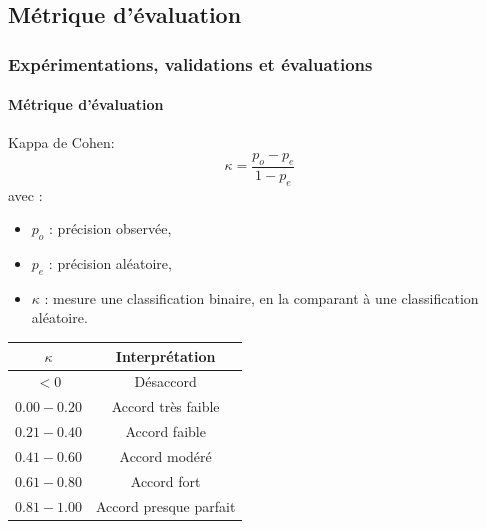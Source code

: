 \documentclass{beamer}
\begin{document}
		\subsection{Métrique d'évaluation}
			\begin{frame}
				\frametitle{Expérimentations, validations et évaluations}
				\framesubtitle{Métrique d'évaluation}
				Kappa de Cohen:
				\begin{equation*}
					\kappa = \frac{p_o - p_e}{1 - p_e}
				\end{equation*}
				avec :
				\begin{itemize}
					\item $p_o$ : précision observée,
					\item $p_e$ : précision aléatoire,
					\item $\kappa$ : mesure une classification binaire, en la comparant à une classification aléatoire.
				\end{itemize}
				\begin{table}
					\centering
					\begin{tabular}{|c|c|}
						\hline
						$\kappa$ & Interprétation \\
						\hline
						$< 0$ & Désaccord \\
						\hline
						$0.00 - 0.20$ & Accord très faible \\
						\hline
						$0.21 - 0.40$ & Accord faible \\
						\hline
						$0.41 - 0.60$ & Accord modéré \\
						\hline
						$0.61 - 0.80$ & Accord fort \\
						\hline
						$0.81 - 1.00$ & Accord presque parfait \\
						\hline
					\end{tabular}
				\end{table}
			\end{frame}
\end{document}
